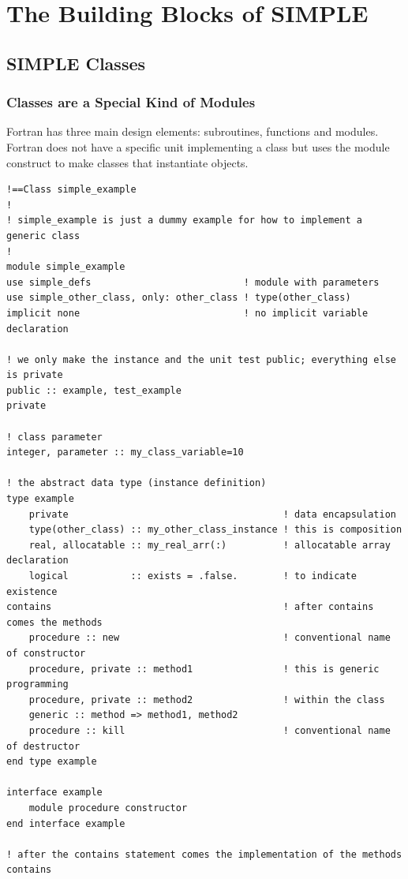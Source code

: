 \documentclass[a4paper,11pt]{article}
\begin{document}
\section{The Building Blocks of SIMPLE}

\subsection{SIMPLE Classes}

\subsubsection{Classes are a Special Kind of Modules}
Fortran has three main design elements: subroutines, functions and modules. Fortran does not have a specific unit implementing a class but uses the module construct  to make classes that instantiate objects.
\begin{verbatim}
!==Class simple_example
!
! simple_example is just a dummy example for how to implement a generic class
!
module simple_example
use simple_defs                           ! module with parameters
use simple_other_class, only: other_class ! type(other_class)
implicit none                             ! no implicit variable declaration

! we only make the instance and the unit test public; everything else is private
public :: example, test_example 
private                         

! class parameter
integer, parameter :: my_class_variable=10

! the abstract data type (instance definition)
type example
    private                                      ! data encapsulation
    type(other_class) :: my_other_class_instance ! this is composition
    real, allocatable :: my_real_arr(:)          ! allocatable array declaration
    logical           :: exists = .false.        ! to indicate existence
contains                                         ! after contains comes the methods
    procedure :: new                             ! conventional name of constructor
    procedure, private :: method1                ! this is generic programming
    procedure, private :: method2                ! within the class
    generic :: method => method1, method2 
    procedure :: kill                            ! conventional name of destructor
end type example

interface example
    module procedure constructor
end interface example

! after the contains statement comes the implementation of the methods
contains
\end{verbatim}
\end{document}
